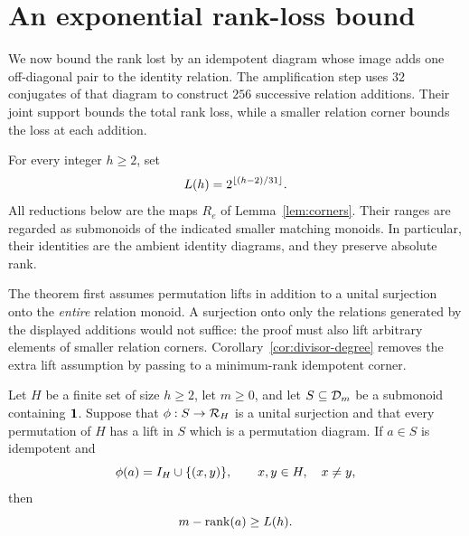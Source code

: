 \section{An exponential rank-loss bound}\label{sec:rank}

We now bound the rank lost by an idempotent diagram whose image adds
one off-diagonal pair to the identity relation. The amplification step
uses $32$ conjugates of that diagram to construct $256$ successive
relation additions. Their joint support bounds the total rank loss,
while a smaller relation corner bounds the loss at each addition.

For every integer $h\ge2$, set
\begin{equation}\label{eq:rank-loss-function}
 L(h)=2^{\lfloor(h-2)/31\rfloor}.
\end{equation}
All reductions below are the maps $R_e$ of Lemma~\ref{lem:corners}.
Their ranges are regarded as submonoids of the indicated smaller
matching monoids. In particular, their identities are the ambient
identity diagrams, and they preserve absolute rank.

The theorem first assumes permutation lifts in addition to a unital
surjection onto the \emph{entire} relation monoid. A surjection onto only
the relations generated by the displayed additions would not suffice:
the proof must also lift arbitrary elements of smaller relation corners.
Corollary~\ref{cor:divisor-degree} removes the extra lift assumption by
passing to a minimum-rank idempotent corner.

\begin{theorem}
\label{thm:rank-loss}
Let $H$ be a finite set of size $h\ge2$, let $m\ge0$, and let
$S\subseteq\mathcal D_{m}$ be a submonoid containing $\mathbf 1$.
Suppose that $\phi:S\to\mathcal R_{H}$ is a unital surjection and that every
permutation of $H$ has a lift in $S$ which is a permutation diagram.
If $a\in S$ is idempotent and
\[
 \phi(a)=I_{H}\cup\{(x,y)\},\qquad x,y\in H,\quad x\ne y,
\]
then
\[
 m-\operatorname{rank}(a)\ge L(h).
\]
\end{theorem}

